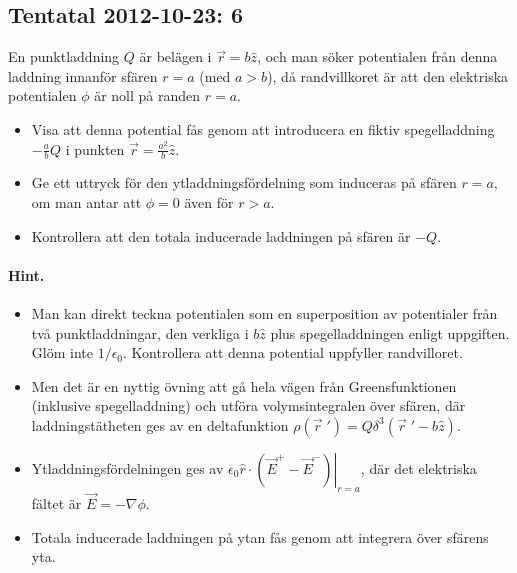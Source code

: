 \documentclass[%
oneside,                 %
final,                   %
10pt]{article}
\newenvironment{doconceexercise}{}{}
\newcounter{doconceexercisecounter}
\begin{document}
\begin{doconceexercise}

\subsection*{Tentatal 2012-10-23: 6}

En punktladdning $Q$ är belägen i $\vec{r} = b\hat{z}$, och man söker potentialen från denna laddning innanför sfären $r = a$ (med $a > b$), då randvillkoret är att den elektriska potentialen $\phi$ är noll på randen $r = a$. 
\begin{itemize}
\item Visa att denna potential fås genom att introducera en fiktiv spegelladdning $−\frac{a}{b}Q$ i punkten $\vec{r} = \frac{a^2}{b} \hat{z}$. 

\item Ge ett uttryck för den ytladdningsfördelning som induceras på sfären $r = a$, om man antar att $\phi = 0$ även för $r > a$. 

\item Kontrollera att den totala inducerade laddningen på sfären är $−Q$.
\end{itemize}

\noindent

\paragraph{Hint.}
\begin{itemize}
\item Man kan direkt teckna potentialen som en superposition av potentialer från två punktladdningar, den verkliga i $b\hat{z}$ plus spegelladdningen enligt uppgiften. Glöm inte $1/\epsilon_0$. Kontrollera att denna potential uppfyller randvilloret.

\item Men det är en nyttig övning att gå hela vägen från Greensfunktionen (inklusive spegelladdning) och utföra volymsintegralen över sfären, där laddningstätheten ges av en deltafunktion $\rho(\vec{r}{\;}') = Q \delta^3(\vec{r}{\;}' - b\hat{z})$.

\item Ytladdningsfördelningen ges av $\epsilon_0 \left. \hat{r} \cdot \left( \vec{E}^+ - \vec{E}^- \right)  \right|_{r=a}$, där det elektriska fältet är $\vec{E} = - \nabla \phi$.

\item Totala inducerade laddningen på ytan fås genom att integrera över sfärens yta.
\end{itemize}


\end{doconceexercise}
\end{document}
